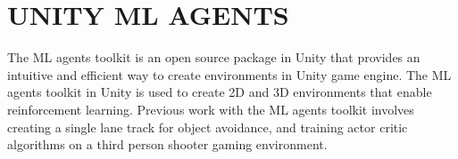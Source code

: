 \section{UNITY ML AGENTS} \label{lit-mlagents}

The ML agents toolkit is an open source package in Unity that provides
an intuitive and efficient way to create environments in Unity game
engine. The ML agents toolkit in Unity is used to create 2D and 3D
environments that enable reinforcement learning. Previous work with
the ML agents toolkit involves creating a single lane track for object
avoidance\cite{MLagents1}, and training actor critic algorithms on a
third person shooter gaming environment\cite{MLagents2}.





